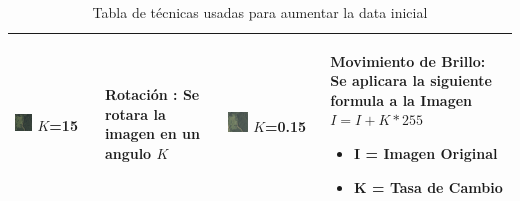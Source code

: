 \begin{table}[H]
\begin{tabular}{|M{0.225\textwidth}|M{0.225\textwidth}|M{0.225\textwidth}|M{0.225\textwidth}|}
\includegraphics[width=0.225\textwidth]{06changedetection/tranformaciones/rotacion.png} $K$=15     &\scriptsize{\textbf{Rotación :} Se rotara la imagen en un angulo $K$ }    &\includegraphics[width=0.225\textwidth]{06changedetection/tranformaciones/moverBrillo.png} $K$=0.15             & \scriptsize{\textbf{Movimiento de Brillo:} Se aplicara la siguiente formula a la Imagen \newline$ I =I+K*255 $  \smallskip \begin{itemize}
\itemsep0em 
 \item I = Imagen Original
 \item K = Tasa de Cambio\end{itemize}  }          \\ \hline
 
 
\end{tabular}

\caption{Tabla de técnicas usadas para aumentar la data inicial}
\label{table:aumentoData} 
\end{table}
